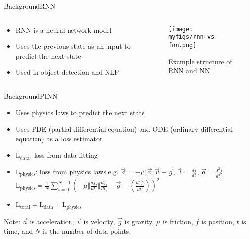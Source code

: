 \documentclass[
	aspectratio=169,	%
	onlytextwidth,		%
	t,					%
	]{beamer}
\begin{document}
\begin{frame}[fragile]{Background}{RNN}
	\begin{columns}
		\begin{column}[T]{.33\textwidth}

			\begin{itemize}
				\item<1-> RNN is a neural network model
				\item<2-> Uses the previous state as an input to predict the next state
				\item<3-> Used in object detection and NLP
			\end{itemize}

		\end{column}

		\begin{column}[T]{.66\textwidth}
			\begin{figure}
				\texttt{[image: myfigs/rnn-vs-fnn.png]}
				\caption{Example structure of RNN and NN~\cite{rnnpic}}
			\end{figure}

		\end{column}

	\end{columns}
\end{frame}

\begin{frame}[fragile]{Background}{PINN}

	\begin{itemize}

		\item Uses physics laws to predict the next state
		\item Uses PDE (partial differential equation) and ODE (ordinary differential equation) as a loss estimator
		\item $\text{L}_{\text{data}}$: loss from data fitting
		\item $\text{L}_{\text{physics}}$: loss from physics laws \newline
			e.g. $\vec{a}= -\mu\Vert\vec{v}\Vert\vec{v} - \vec{g}$, $\vec{v} = \frac{df}{dt}$, $\vec{a}= \frac{d^{2}f}{dt^{2}}$ \newline \vfill
			$\text{L}_{\text{physics}} = \frac{1}{N}\sum_{i=0}^{N-1} \left(-\mu\Vert\frac{df_{i}}{dt_{i}}\Vert\frac{df_{i}}{dt_{i}} - \vec{g} - \left(\frac{d^{2}f_{i}}{dt_{i}^{2}}\right)\right)^{2}$
			\item $\text{L}_{\text{total}} = \text{L}_{\text{data}} + \text{L}_{\text{physics}}$

	\end{itemize}
	\vfill
	Note: $\vec{a}$ is acceleration, $\vec{v}$ is velocity, $\vec{g}$ is gravity, $\mu$ is friction, $f$ is position, $t$ is time, and $N$ is the number of data points.

\end{frame}
\end{document}
